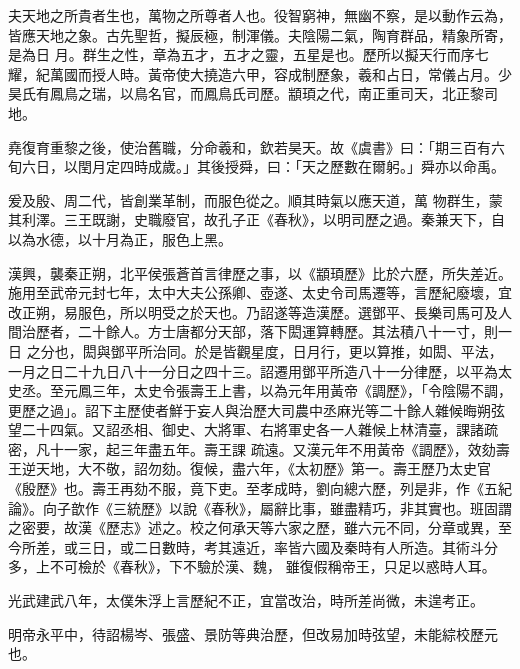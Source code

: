 
\begin{pinyinscope}

 夫天地之所貴者生也，萬物之所尊者人也。役智窮神，無幽不察，是以動作云為，皆應天地之象。古先聖哲，擬辰極，制渾儀。夫陰陽二氣，陶育群品，精象所寄，是為日
 月。群生之性，章為五才，五才之靈，五星是也。歷所以擬天行而序七耀，紀萬國而授人時。黃帝使大撓造六甲，容成制歷象，羲和占日，常儀占月。少昊氏有鳳鳥之瑞，以鳥名官，而鳳鳥氏司歷。顓頊之代，南正重司天，北正黎司地。



 堯復育重黎之後，使治舊職，分命羲和，欽若昊天。故《虞書》曰：「期三百有六旬六日，以閏月定四時成歲。」其後授舜，曰：「天之歷數在爾躬。」舜亦以命禹。



 爰及殷、周二代，皆創業革制，而服色從之。順其時氣以應天道，萬
 物群生，蒙其利澤。三王既謝，史職廢官，故孔子正《春秋》，以明司歷之過。秦兼天下，自以為水德，以十月為正，服色上黑。



 漢興，襲秦正朔，北平侯張蒼首言律歷之事，以《顓頊歷》比於六歷，所失差近。施用至武帝元封七年，太中大夫公孫卿、壺遂、太史令司馬遷等，言歷紀廢壞，宜改正朔，易服色，所以明受之於天也。乃詔遂等造漢歷。選鄧平、長樂司馬可及人間治歷者，二十餘人。方士唐都分天部，落下閎運算轉歷。其法積八十一寸，則一日
 之分也，閎與鄧平所治同。於是皆觀星度，日月行，更以算推，如閎、平法，一月之日二十九日八十一分日之四十三。詔遷用鄧平所造八十一分律歷，以平為太史丞。至元鳳三年，太史令張壽王上書，以為元年用黃帝《調歷》，「令陰陽不調，更歷之過」。詔下主歷使者鮮于妄人與治歷大司農中丞麻光等二十餘人雜候晦朔弦望二十四氣。又詔丞相、御史、大將軍、右將軍史各一人雜候上林清臺，課諸疏密，凡十一家，起三年盡五年。壽王課
 疏遠。又漢元年不用黃帝《調歷》，效劾壽王逆天地，大不敬，詔勿劾。復候，盡六年，《太初歷》第一。壽王歷乃太史官《殷歷》也。壽王再劾不服，竟下吏。至孝成時，劉向總六歷，列是非，作《五紀論》。向子歆作《三統歷》以說《春秋》，屬辭比事，雖盡精巧，非其實也。班固謂之密要，故漢《歷志》述之。校之何承天等六家之歷，雖六元不同，分章或異，至今所差，或三日，或二日數時，考其遠近，率皆六國及秦時有人所造。其術斗分多，上不可檢於《春秋》，下不驗於漢、魏，
 雖復假稱帝王，只足以惑時人耳。



 光武建武八年，太僕朱浮上言歷紀不正，宜當改治，時所差尚微，未遑考正。



 明帝永平中，待詔楊岑、張盛、景防等典治歷，但改易加時弦望，未能綜校歷元也。




\end{pinyinscope}
